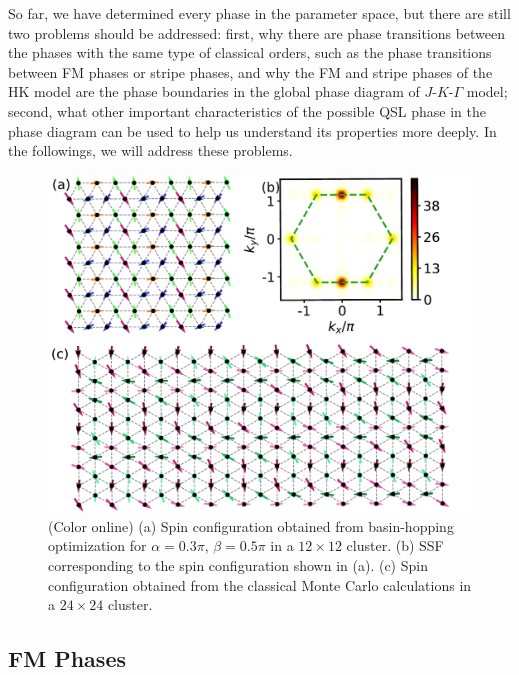 \documentclass[aps,prb,reprint,amsfonts,amsmath,amssymb,showpacs,groupedaddress,superscriptaddress]{revtex4-1}
\begin{document}
So far, we have determined every phase in the parameter space, but there are still two problems should be addressed: first, why there are phase transitions between the phases with the same type of classical orders, such as the phase transitions between FM phases or stripe phases, and why the FM and stripe phases of the HK model are the phase boundaries in the global phase diagram of $J$-$K$-$\Gamma$ model; second, what other important characteristics of the possible QSL phase in the phase diagram can be used to help us understand its properties more deeply. In the followings, we will address these problems.

\begin{figure}
    \centering
    \includegraphics[width=0.95\columnwidth]{fig/ModulatedStripe.pdf}
    \caption{\label{fig:ModulatedStripe}(Color online) (a) Spin configuration obtained from basin-hopping optimization for $\alpha=0.3\pi$, $\beta=0.5\pi$ in a $12 \times 12$ cluster. (b) SSF corresponding to the spin configuration shown in (a). (c) Spin configuration obtained from the classical Monte Carlo calculations in a $24 \times 24$ cluster.}
\end{figure}

\subsection{\label{subsec:FMPhases}FM Phases}
\end{document}
